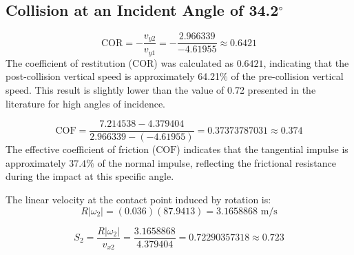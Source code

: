 \documentclass[11pt,letterpaper]{article}
\begin{document}
\begin{table}[h!]
\centering
\caption{Raw kinematic data for the four experimental videos extracted via Tracker software.}
\label{tab:tracker_raw_data}
\end{table}

\subsection{Collision at an Incident Angle of 34.2$^\circ$}
$$ \text{COR} = -\frac{v_{y2}}{v_{y1}} = -\frac{2.966339}{-4.61955} \approx 0.6421 $$
The coefficient of restitution ($\text{COR}$) was calculated as $0.6421$, indicating that the post-collision vertical speed is approximately 64.21\% of the pre-collision vertical speed. This result is slightly lower than the value of 0.72 presented in the literature for high angles of incidence.

$$ \text{COF} = \frac{7.214538 - 4.379404}{2.966339 - (-4.61955)} = 0.37373787031 \approx 0.374 $$
The effective coefficient of friction ($\text{COF}$) indicates that the tangential impulse is approximately $37.4\%$ of the normal impulse, reflecting the frictional resistance during the impact at this specific angle.

\noindent The linear velocity at the contact point induced by rotation is:
$$ R|\omega_2| = (0.036)(87.9413) = 3.1658868 \text{ m/s} $$

\vspace{1em}
$$ S_2 = \frac{R|\omega_2|}{v_{x2}} = \frac{3.1658868}{4.379404} = 0.72290357318 \approx 0.723 $$
\end{document}
